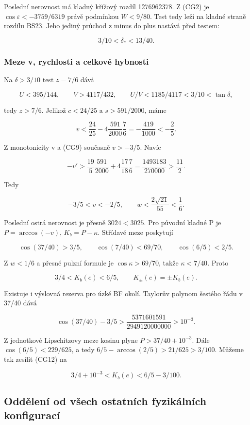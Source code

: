 \documentclass[11pt,a4paper]{article}
\theoremstyle{remark}\newtheorem{remark}[theorem]{Poznámka}
\numberwithin{equation}{section}
\begin{document}
Poslední nerovnost má kladný křížový rozdíl 1276962378. Z (CG2) je
\(\cos\varepsilon<-3759/6319\) právě podmínkou \(W<9/80\). Test tedy
leží na kladné straně rozdílu BS23. Jeho jediný průchod z minus do plus
nastává před testem:

\[
\boxed{3/10<\delta_*<13/40.}
\tag{CG10}
\]

\hypertarget{meze-v-rychlosti-a-celkovuxe9-hybnosti}{%
\subsubsection{Meze v, rychlosti a celkové
hybnosti}\label{meze-v-rychlosti-a-celkovuxe9-hybnosti}}

Na \(\delta>3/10\) test \(z=7/6\) dává

\[
U<395/144,\qquad V>4117/432,
\qquad U/V<1185/4117<3/10<\tan\delta,
\]

tedy \(z>7/6\). Jelikož \(c<24/25\) a \(s>591/2000\), máme

\[
v<\frac{24}{25}-4\frac{591}{2000}\frac76
=-\frac{419}{1000}<-\frac25.
\]

Z monotonicity v a (CG9) současně \(v>-3/5\). Navíc

\[
-v'>\frac{19}{5}\frac{591}{2000}
   +4\frac{17}{18}\frac76
=\frac{1493183}{270000}>\frac{11}{2}.
\]

Tedy

\[
\boxed{-3/5<v<-2/5,\qquad
 w<\frac{2\sqrt{21}}{55}<\frac16.}
\tag{CG11}
\]

Poslední ostrá nerovnost je přesně \(3024<3025\). Pro původní kladné P
je \(P=\arccos(-v)\), \(K_b=P-\kappa\). Střídavé meze poskytují

\[
\cos(37/40)>3/5,
\qquad \cos(7/40)<69/70,
\qquad \cos(6/5)<2/5.
\]

Z \(w<1/6\) a přesné pulzní formule je \(\cos\kappa>69/70\), takže
\(\kappa<7/40\). Proto

\[
\boxed{3/4<K_b(e)<6/5,\qquad K_\pm(e)=\pm K_b(e).}
\tag{CG12}
\]

Existuje i výslovná rezerva pro úzké BF okolí. Taylorův polynom šestého
řádu v 37/40 dává

\[
\cos(37/40)-3/5>
\frac{5371601591}{2949120000000}>10^{-3}.
\]

Z jednotkové Lipschitzovy meze kosinu plyne \(P>37/40+10^{-3}\). Dále
\(\cos(6/5)<229/625\), a tedy \(6/5-\arccos(2/5)>21/625>3/100\). Můžeme
tak zesílit (CG12) na

\[
\boxed{3/4+10^{-3}<K_b(e)<6/5-3/100.}
\tag{CG13}
\]

\hypertarget{oddux11blenuxed-od-vux161ech-ostatnuxedch-fyzikuxe1lnuxedch-konfiguracuxed}{%
\subsection{Oddělení od všech ostatních fyzikálních
konfigurací}\label{oddux11blenuxed-od-vux161ech-ostatnuxedch-fyzikuxe1lnuxedch-konfiguracuxed}}
\end{document}

